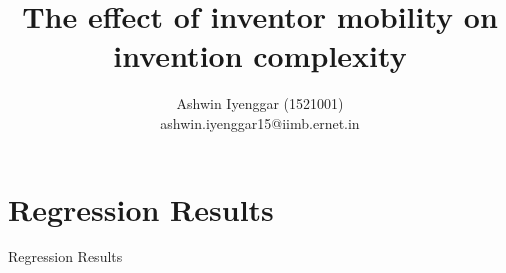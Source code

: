 \documentclass[12pt]{article}
\begin{document}
\title{The effect of inventor mobility on  invention complexity}
\author{Ashwin Iyenggar  (1521001) \\ ashwin.iyenggar15@iimb.ernet.in} 

\maketitle
\thispagestyle{empty}

\section{Regression Results}
\begin{table}
\caption{Regression Results}

\end{table}

 

\end{document}
